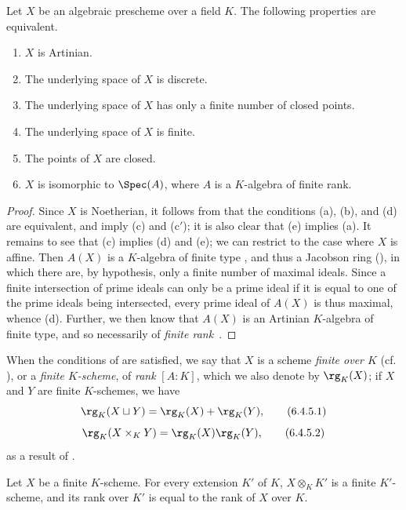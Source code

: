 \begin{proposition}[6.4.4]
\label{I.6.4.4}
Let $X$ be an algebraic prescheme over a field $K$.
The following properties are equivalent.
\begin{enumerate}
  \item[{\rm(a)}] $X$ is Artinian.
  \item[{\rm(b)}] The underlying space of $X$ is discrete.
  \item[{\rm(c)}] The underlying space of $X$ has only a finite number of closed points.
  \item[{\rm(c')}] The underlying space of $X$ is finite.
  \item[{\rm(d)}] The points of $X$ are closed.
  \item[{\rm(e)}] $X$ is isomorphic to $\Spec(A)$, where $A$ is a $K$-algebra of finite rank.
\end{enumerate}
\end{proposition}

\begin{proof}
Since $X$ is Noetherian, it follows from  that the conditions (a), (b), and (d) are equivalent, and imply (c) and (c$'$);
it is also clear that (e) implies (a).
It remains to see that (c) implies (d) and (e);
we can restrict to the case where $X$ is affine.
Then $A(X)$ is a $K$-algebra of finite type , and thus a Jacobson ring (\cite[p.~3-11 and 3-12]{I-1}), in which there are, by hypothesis, only a finite number of maximal ideals.
Since a finite intersection of prime ideals can only be a prime ideal if it is equal to one of the prime ideals being intersected, every prime ideal of $A(X)$ is thus maximal, whence (d).
Further, we then know  that $A(X)$ is an Artinian $K$-algebra of finite type, and so necessarily of \emph{finite rank}~\cite{I-21}.
\end{proof}

\begin{env}[6.4.5]
\label{I.6.4.5}
When the conditions of  are satisfied, we say that $X$ is a scheme \emph{finite over $K$} (cf. ), or a \emph{finite $K$-scheme}, of \emph{rank} $[A:K]$, which we also denote by $\rg_K(X)$;
if $X$ and $Y$ are finite $K$-schemes, we have
\[
  \rg_K(X\sqcup Y)=\rg_K(X)+\rg_K(Y),
  \tag{6.4.5.1}
\]
\[
  \rg_K(X\times_K Y)=\rg_K(X)\rg_K(Y),
  \tag{6.4.5.2}
\]
as a result of .
\end{env}

\begin{corollary}[6.4.6]
\label{I.6.4.6}
Let $X$ be a finite $K$-scheme.
For every extension $K'$ of $K$, $X\otimes_K K'$ is a finite $K'$-scheme, and its rank over $K'$ is equal to the rank of $X$ over $K$.
\end{corollary}

